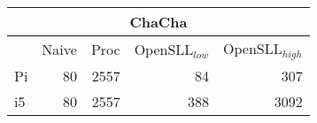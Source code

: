 \begin{frame}
\begin{minipage}[b]{0.55\textwidth}
\begin{tabular}{l r r r r}
\multicolumn{5}{c}{ChaCha}\\
\hline
 & Naive & Proc & OpenSLL$_{low}$ & OpenSLL$_{high}$\\
\hline
Pi & 80 & 2557 & 84 & 307\\
i5 &  80  &  2557    & 388   & 3092
\end{tabular}
\end{minipage}
\end{frame}
